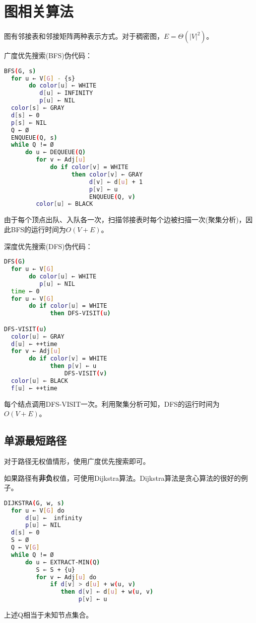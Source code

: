 \section{图相关算法}
图有邻接表和邻接矩阵两种表示方式。对于稠密图，$E=\Theta(|V|^2)$。

广度优先搜索(BFS)伪代码：
\begin{lstlisting}[language=bash]
BFS(G, s)
  for u ← V[G] - {s}
       do color[u] ← WHITE
          d[u] ← INFINITY
          p[u] ← NIL
  color[s] ← GRAY
  d[s] ← 0
  p[s] ← NIL
  Q ← Ø
  ENQUEUE(Q, s)
  while Q != Ø
      do u ← DEQUEUE(Q)
         for v ← Adj[u] 
             do if color[v] = WHITE
                   then color[v] ← GRAY
                        d[v] ← d[u] + 1
                        p[v] ← u
                        ENQUEUE(Q, v)
         color[u] ← BLACK
\end{lstlisting}
由于每个顶点出队、入队各一次，扫描邻接表时每个边被扫描一次(聚集分析)，因此BFS的运行时间为$O(V+E)$。

深度优先搜索(DFS)伪代码：
\begin{lstlisting}[language=bash]
DFS(G)
  for u ← V[G]
       do color[u] ← WHITE
          p[u] ← NIL
  time ← 0
  for u ← V[G]
       do if color[u] = WHITE
             then DFS-VISIT(u)

DFS-VISIT(u)
  color[u] ← GRAY
  d[u] ← ++time
  for v ← Adj[u] 
       do if color[v] = WHITE
             then p[v] ← u
                 DFS-VISIT(v)
  color[u] ← BLACK
  f[u] ← ++time
\end{lstlisting}
每个结点调用DFS-VISIT一次。利用聚集分析可知，DFS的运行时间为$O(V+E)$。

\subsection{单源最短路径}
对于路径无权值情形，使用广度优先搜索即可。

如果路径有\textbf{非负}权值，可使用Dijkstra算法。Dijkstra算法是贪心算法的很好的例子。




\begin{lstlisting}[language=bash]
DIJKSTRA(G, w, s)
  for u ← V[G] do 
      d[u] ←  infinity
      p[u] ← NIL
  d[s] ← 0
  S ← Ø
  Q ← V[G] 
  while Q != Ø
      do u ← EXTRACT-MIN(Q)
         S ← S + {u}
         for v ← Adj[u] do
             if d[v] > d[u] + w(u, v)
                then d[v] ← d[u] + w(u, v)
                     p[v] ← u
\end{lstlisting}
上述Q相当于未知节点集合。


